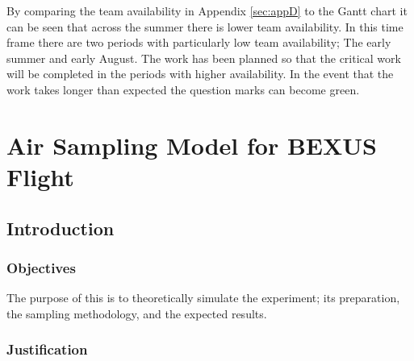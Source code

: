 \documentclass[a4paper,12pt,oneside]{article} %
\providecommand{\DIFaddbegin}{} %
\providecommand{\DIFaddend}{} %
\newcommand{\DIFaddincludegraphics}[2][]{{\color{blue}\fbox{\DIFOincludegraphics[#1]{#2}}}} %
\DeclareRobustCommand{\DIFaddbegin}{\DIFOaddbegin \let\includegraphics\DIFaddincludegraphics} %
\DeclareRobustCommand{\DIFaddend}{\DIFOaddend \let\includegraphics\DIFOincludegraphics} %
\begin{document}
\begin{appendices}
\begin{landscape}
\DIFaddend By comparing the team availability in Appendix \ref{sec:appD} to the Gantt chart it can be seen that across the summer there is lower team availability. In this time frame there are two periods with particularly low team availability; The early summer and early August. The work has been planned so that the critical work will be completed in the periods with higher availability. In the event that the work takes longer than expected the question marks can become green.
\DIFaddbegin \end{landscape}
\DIFaddend 





\section{Air Sampling Model for BEXUS Flight}\label{sec:appH}


\subsection{Introduction}


\subsubsection{Objectives}

The purpose of this is to theoretically simulate the experiment; its preparation, the sampling methodology, and the expected results.

\subsubsection{Justification}


\end{appendices}
\end{document}
